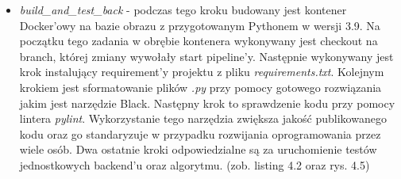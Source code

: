\begin{itemize}
\newpage
	\item \textit{build\_and\_test\_back} - podczas tego kroku budowany jest kontener Docker'owy na bazie obrazu z przygotowanym Pythonem w wersji 3.9. Na początku tego zadania w obrębie kontenera wykonywany jest checkout na branch, której zmiany wywołały start pipeline'y. Następnie wykonywany jest krok instalujący requirement'y projektu z pliku \textit{requirements.txt}. Kolejnym krokiem jest sformatowanie plików \textit{.py} przy pomocy gotowego rozwiązania jakim jest narzędzie Black. Następny krok to sprawdzenie kodu przy pomocy lintera \textit{pylint}. Wykorzystanie tego narzędzia zwiększa jakość publikowanego kodu oraz go standaryzuje w przypadku rozwijania oprogramowania przez wiele osób. Dwa ostatnie kroki odpowiedzialne są za uruchomienie testów jednostkowych backend'u oraz algorytmu. (zob. listing 4.2 oraz rys. 4.5)
	

\end{itemize}
